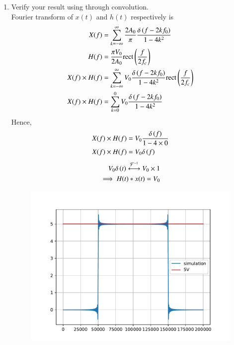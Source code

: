\documentclass[journal,12pt,twocolumn]{IEEEtran}
\renewcommand\thesection{\arabic{section}}
\begin{document}
\begin{enumerate}[label=\thesection.\arabic*
,ref=\thesection.\theenumi]
\item Verify your result using through convolution. \\ 
\solution 
	Fourier transform of $x(t)$ and $h(t)$ respectively is
	\begin{align}
		X(f)&=\sum_{k=-\infty}^{\infty} \frac{2A_0}{\pi} \frac{\delta\left(f-2kf_0\right)}{1-4k^2}\\
		H(f)&=\frac{\pi V_0}{2A_0}\text{rect}\left(\frac{f}{2f_c}\right)\\
		X(f) \times H(f)&=\sum_{k=-\infty}^{\infty} V_0 \frac{\delta\left(f-2kf_0\right)}{1-4k^2} \text{rect}\left(\frac{f}{2f_c}\right)\\
		X(f)\times H(f)&=\sum_{k=0}^{0} V_0 \frac{\delta\left(f-2kf_0\right)}{1-4k^2}
	\end{align} 
	Hence,
	\begin{align}
		X(f)\times H(f)&=V_0 \frac{\delta\left(f\right)}{1-4 \times 0}\\
		X(f)\times H(f)&=V_0 \delta\left(f\right)
	\end{align} 
\begin{align}
	V_0 \delta\left(t\right) \stackrel{\mathcal{F}^{-1}}{\longleftrightarrow} V_0\times 1	\\
\implies H(t) * x(t)=V_0
\end{align}
\begin{figure}[!ht]
	\includegraphics[width=0.9\columnwidth]{figs/4_3.pdf}
\end{figure}
\end{enumerate}
\vfill{}
\end{document}
